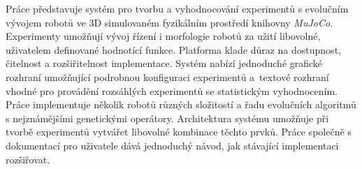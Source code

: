 \documentclass[12pt]{report}
\begin{document}
Práce představuje systém pro tvorbu a vyhodnocování experimentů s evolučním
vývojem robotů ve 3D simulovaném fyzikálním prostředí knihovny \emph{MuJoCo}.
Experimenty umožňují vývoj řízení i morfologie robotů za užití libovolné,
uživatelem definované hodnotící funkce. Platforma klade důraz na dostupnost,
čitelnost a rozšiřitelnost implementace. Systém nabízí jednoduché grafické
rozhraní umožňující podrobnou konfiguraci experimentů a~textové rozhraní
vhodné pro provádění rozsáhlých experimentů se statistickým vyhodnocením. Práce
implementuje několik robotů různých složitostí a řadu evolučních algoritmů s
nejznámějšími genetickými operátory. Architektura systému umožňuje při
tvorbě experimentů vytvářet libovolné kombinace těchto prvků. Práce společně s
dokumentací pro uživatele dává jednoduchý návod, jak stávající implementaci
rozšiřovat.
\end{document}
